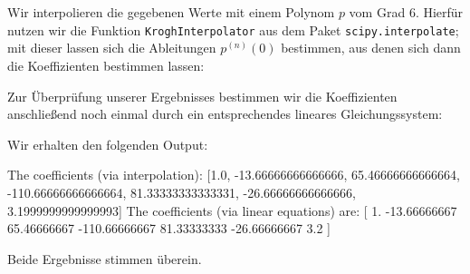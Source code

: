 \section{}

Wir interpolieren die gegebenen Werte mit einem Polynom $p$ vom Grad $6$.
Hierfür nutzen wir die Funktion \texttt{KroghInterpolator} aus dem Paket \texttt{scipy.interpolate};
mit dieser lassen sich die Ableitungen $p^{(n)}(0)$ bestimmen, aus denen sich dann die Koeffizienten bestimmen lassen:



Zur Überprüfung unserer Ergebnisses bestimmen wir die Koeffizienten anschließend noch einmal durch ein entsprechendes lineares Gleichungssystem:



Wir erhalten den folgenden Output:

\begin{consoleoutput}
The coefficients (via interpolation):
[1.0, -13.66666666666666, 65.46666666666664, -110.66666666666664, 81.33333333333331, -26.66666666666666, 3.1999999999999993]
The coefficients (via linear equations) are:
[   1.          -13.66666667   65.46666667 -110.66666667   81.33333333
  -26.66666667    3.2       ]
\end{consoleoutput}

Beide Ergebnisse stimmen überein.
